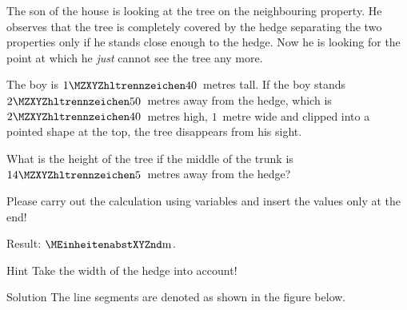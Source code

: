 \begin{MExercises}
\begin{MExercise}
The son of the house is looking at the tree on the neighbouring property. He observes 
that the tree is completely covered by the hedge separating the two properties only if
he stands close enough to the hedge. Now he is looking for the point at which 
he \textit{just} cannot see the tree any more. 

The boy is $\MZahl{1}{40}$~metres tall. If the boy stands
$\MZahl{2}{50}$~metres away from the hedge, which is $\MZahl{2}{40}$~metres 
high, $1$~metre wide and clipped into a pointed shape at the top, the tree 
disappears from his sight.

What is the height of the tree if the middle of the trunk is $\MZahl{14}{5}$~metres away from 
the hedge?

Please carry out the calculation using variables and insert the values only at the end!

Result:  $\MEinheit{m}$.

\begin{MHint}{Hint}
Take the width of the hedge into account!
\end{MHint}

\begin{MHint}{Solution}
The line segments are denoted as shown in the figure below.


\end{MHint}
\end{MExercise}
\end{MExercises}
